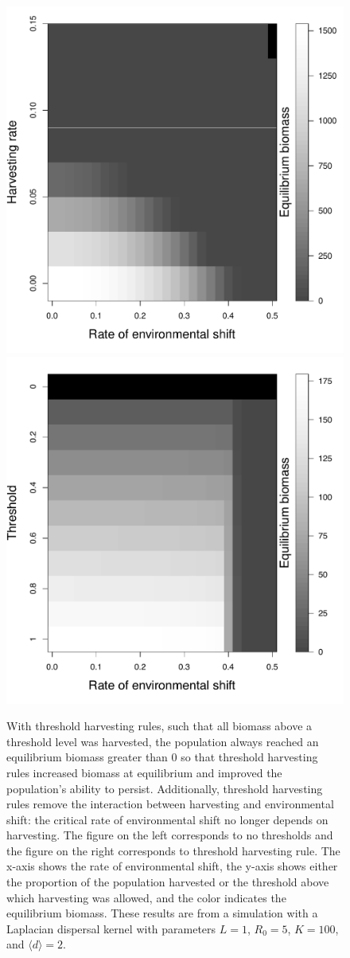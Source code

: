 \documentclass[]{article}
\begin{document}
\begin{figure}[htbp]
\begin{center}
\includegraphics[width=.45\textwidth]{plots/eqbiomass_sim.pdf}
\includegraphics[width=.45\textwidth]{plots/eqbiomass_thresh.pdf}
\caption{With threshold harvesting rules, such that all biomass above a threshold level was harvested, the population always reached an equilibrium biomass greater than $0$ so that threshold harvesting rules increased biomass at equilibrium and improved the population's ability to persist. Additionally, threshold harvesting rules remove the interaction between harvesting and environmental shift: the critical rate of environmental shift no longer depends on harvesting. The figure on the left corresponds to no thresholds and the figure on the right corresponds to threshold harvesting rule.  The x-axis shows the rate of environmental shift, the y-axis shows either the proportion of the population harvested or the threshold above which harvesting was allowed, and the color indicates the equilibrium biomass.  These results are from a simulation with a Laplacian dispersal kernel with parameters $L=1$, $R_0=5$, $K=100$, and $\langle d \rangle =2$. }
\label{thresholds}
\end{center}
\end{figure}
\end{document}
